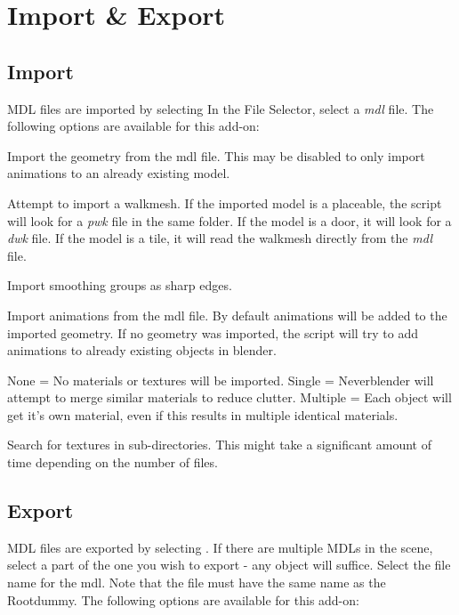\chapter{Import \& Export}

\section{Import}
MDL files are imported by selecting  In the File Selector, 
select a \textit{mdl} file. The following options are available for this add-on: 

\begin{description}[leftmargin=13em,style=nextline]
    \item[Import Geometry] Import the geometry from the mdl file. This may be disabled to only import animations to an already existing model.
    \item[Import Walkmesh] Attempt to import a walkmesh. If the imported model is a placeable, the script will look for a {\textit{pwk}} file in the same folder. If the model is a door, it will look for a {\textit{dwk}} file. If the model is a tile, it will read the walkmesh directly from the \textit{mdl} file.
    \item[Import Smooth Groups] Import smoothing groups as sharp edges.
    \item[Import Animations] Import animations from the mdl file. By default animations will be added to the imported geometry. If no geometry was imported, the script will try to add animations to already existing objects in blender.
    \item[Materials] None = No materials or textures will be imported. Single = Neverblender will attempt to merge similar materials to reduce clutter. Multiple = Each object will get it's own material, even if this results in multiple identical materials.
    \item[Image Search] Search for textures in sub-directories. This might take a significant amount of time depending on the number of files.
\end{description}

\section{Export}
MDL files are exported by selecting . If there are multiple MDLs in the scene,
select a part of the one you wish to export - any object will suffice. Select the file name for the mdl. Note that the 
file must have the same name as the Rootdummy. The following options are available for this add-on: 

